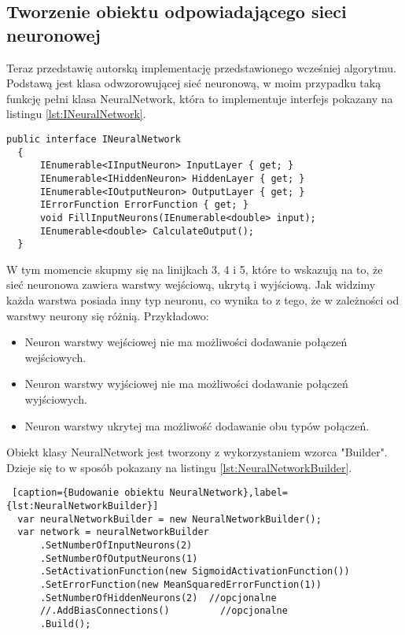 
\subsection{Tworzenie obiektu odpowiadającego sieci neuronowej}

Teraz przedstawię autorską implementację przedstawionego wcześniej algorytmu.
Podstawą jest klasa odwzorowującej sieć neuronową, w moim przypadku
taką funkcję pełni klasa NeuralNetwork, która to implementuje interfejs pokazany na listingu \ref{lst:INeuralNetwork}.

\begin{lstlisting}[caption={Interfejs INeuralNetwork}, label={lst:INeuralNetwork}]
  public interface INeuralNetwork
  {
      IEnumerable<IInputNeuron> InputLayer { get; }
      IEnumerable<IHiddenNeuron> HiddenLayer { get; }
      IEnumerable<IOutputNeuron> OutputLayer { get; }
      IErrorFunction ErrorFunction { get; }
      void FillInputNeurons(IEnumerable<double> input);
      IEnumerable<double> CalculateOutput();
  }
\end{lstlisting}

W tym momencie skupmy się na linijkach 3, 4 i 5, które to wskazują na to, że sieć neuronowa zawiera warstwy wejściową, ukrytą i wyjściową.
Jak widzimy każda warstwa posiada inny typ neuronu, co wynika to z tego, że w zależności od warstwy neurony się różnią. Przykładowo:
\begin{itemize}
  \item Neuron warstwy wejściowej nie ma możliwości dodawanie połączeń wejściowych.
  \item Neuron warstwy wyjściowej nie ma możliwości dodawanie połączeń wyjściowych.
  \item Neuron warstwy ukrytej ma możliwość dodawanie obu typów połączeń.
\end{itemize}

Obiekt klasy NeuralNetwork jest tworzony z wykorzystaniem wzorca "Builder".
Dzieje się to w sposób pokazany na listingu \ref{lst:NeuralNetworkBuilder}.

\begin{lstlisting} [caption={Budowanie obiektu NeuralNetwork},label={lst:NeuralNetworkBuilder}]
  var neuralNetworkBuilder = new NeuralNetworkBuilder();
  var network = neuralNetworkBuilder
      .SetNumberOfInputNeurons(2)
      .SetNumberOfOutputNeurons(1)
      .SetActivationFunction(new SigmoidActivationFunction())
      .SetErrorFunction(new MeanSquaredErrorFunction(1))
      .SetNumberOfHiddenNeurons(2)  //opcjonalne
      //.AddBiasConnections()         //opcjonalne
      .Build();
\end{lstlisting}

